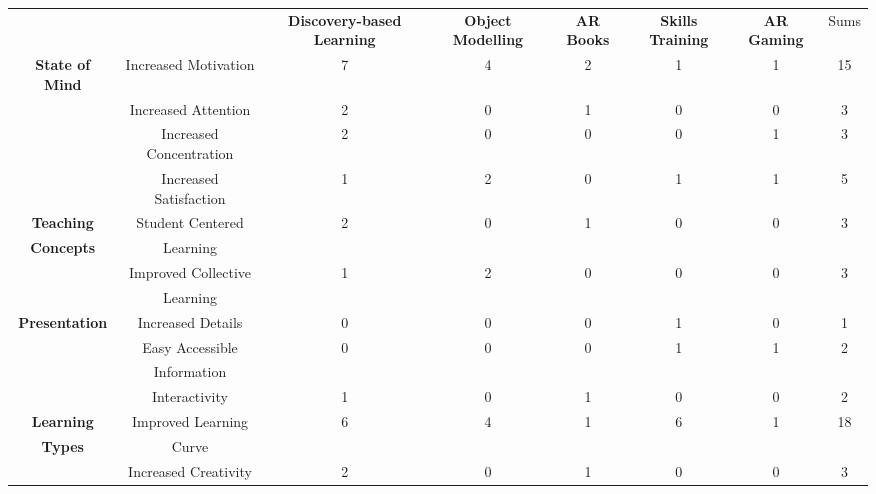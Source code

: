 \begin{landscape}
\begin{table}[!htb]
    \center
    \begin{adjustwidth}{-1.25cm}{}
    \vspace{-2.25cm}
    \begin{tabular}{c | c | c | c | c | c | c | c}
        \textbf{} & \textbf{} & \textbf{Discovery-based Learning} & \textbf{Object Modelling} & \textbf{AR Books} & \textbf{Skills Training} & \textbf{AR Gaming} & Sums \\
        \cline{1-8}
        \textbf{State of Mind} & Increased Motivation & 7 & 4 & 2 & 1 & 1 & 15 \\
        \cline{2-8}
        & Increased Attention & 2 & 0 & 1 & 0 & 0 & 3 \\
        \cline{2-8}
        & Increased Concentration & 2 & 0 & 0 & 0 & 1 & 3 \\
        \cline{2-8}
        & Increased Satisfaction & 1 & 2 & 0 & 1 & 1 & 5 \\
        \cline{1-8}
        \textbf{Teaching} & Student Centered & 2 & 0 & 1 & 0 & 0 & 3 \\ \textbf{Concepts} & Learning & & & & & \\
        \cline{2-8}
        & Improved Collective & 1 & 2 & 0 & 0 & 0 & 3 \\ & Learning & & & & & \\
        \cline{1-8}
        \textbf{Presentation} & Increased Details & 0 & 0 & 0 & 1 & 0 & 1 \\
        \cline{2-8}
        & Easy Accessible & 0 & 0 & 0 & 1 & 1 & 2 \\ & Information & & & & & \\
        \cline{2-8}
        & Interactivity & 1 & 0 & 1 & 0 & 0 & 2 \\
        \cline{1-8}
        \textbf{Learning} & Improved Learning & 6 & 4 & 1 & 6 & 1 & 18 \\ \textbf{Types} & Curve & & & & & \\
        \cline{2-8}
        & Increased Creativity & 2 & 0 & 1 & 0 & 0 & 3 \\

\end{tabular}
\end{adjustwidth}
\end{table}
\end{landscape}
